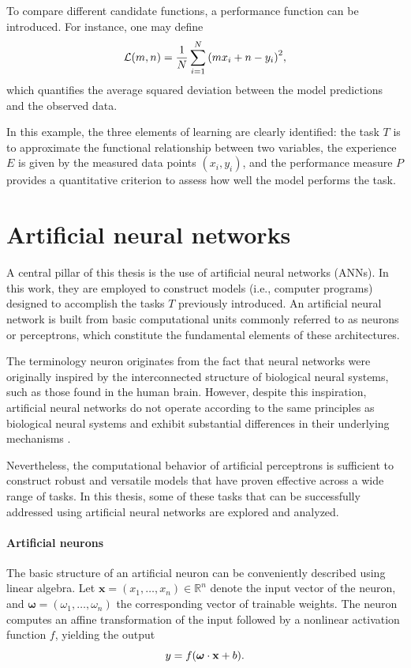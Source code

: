 To compare different candidate functions, a performance function can be introduced. For instance, one may define
\begin{equation}
    \mathcal{L}(m,n) =
    \frac{1}{N} \sum_{i=1}^{N}
    \qty( m x_i + n - y_i )^2 ,
\end{equation}
which quantifies the average squared deviation between the model predictions and the observed data.

In this example, the three elements of learning are clearly identified: the task $T$ is to approximate the functional relationship between two variables, the experience $E$ is given by the measured data points $(x_i, y_i)$, and the performance measure $P$ provides a quantitative criterion to assess how well the model performs the task.


\section{Artificial neural networks}
\label{sec:neural_networks}

A central pillar of this thesis is the use of artificial neural networks (ANNs). In this work, they are employed to construct models (i.e., computer programs) designed to accomplish the tasks $T$ previously introduced. An artificial neural network is built from basic computational units commonly referred to as neurons or perceptrons, which constitute the fundamental elements of these architectures.

The terminology neuron originates from the fact that neural networks were originally inspired by the interconnected structure of biological neural systems, such as those found in the human brain. However, despite this inspiration, artificial neural networks do not operate according to the same principles as biological neural systems and exhibit substantial differences in their underlying mechanisms \cite{Bowers2023}.

Nevertheless, the computational behavior of artificial perceptrons is sufficient to construct robust and versatile models that have proven effective across a wide range of tasks. In this thesis, some of these tasks that can be successfully addressed using artificial neural networks are explored and analyzed.

\paragraph{Artificial neurons}
The basic structure of an artificial neuron can be conveniently described using linear algebra. Let
$\mathbf{x} = (x_1, \dots, x_n) \in \mathbb{R}^n$
denote the input vector of the neuron, and
$\boldsymbol{\omega} = (\omega_1, \dots, \omega_n)$
the corresponding vector of trainable weights. The neuron computes an affine transformation of the input followed by a nonlinear activation function $f$, yielding the output
\begin{equation}
    \label{eq:single-neuron}
    y = f \qty( \boldsymbol{\omega} \cdot \mathbf{x} + b ).
\end{equation}

